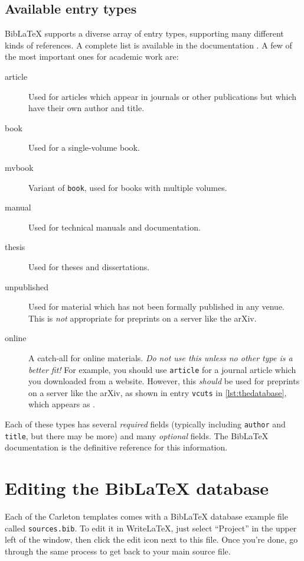 \documentclass{article}
\newcommand*{\code}[1]{\texttt{#1}}
\begin{document}
\subsection{Available entry types}
\label{s:entrytypes}
Bib\LaTeX{} supports a diverse array of entry types, supporting many different kinds of references.
A complete list is available in the documentation \cite{biblatex}.
A few of the most important ones for academic work are:
\begin{description}
\item[article]
  Used for articles which appear in journals or other publications but which have their own author and title.

\item[book]
  Used for a single-volume book.

\item[mvbook]
  Variant of \code{book}, used for books with multiple volumes.

\item[manual]
  Used for technical manuals and documentation.

\item[thesis]
  Used for theses and dissertations.

\item[unpublished]
  Used for material which has not been formally published in any venue.
  This is \emph{not} appropriate for preprints on a server like the arXiv.

\item[online]
  A catch-all for online materials.
  \emph{Do not use this unless no other type is a better fit!}
  For example, you should use \code{article} for a journal article which you downloaded from a website.
  However, this \emph{should} be used for preprints on a server like the arXiv, as shown in entry \code{vcuts} in \cref{lst:thedatabase}, which appears as \cite{vcuts}.
\end{description}

Each of these types has several \emph{required} fields (typically including \code{author} and \code{title}, but there may be more) and many \emph{optional} fields.
The Bib\LaTeX{} documentation is the definitive reference for this information.

\section{Editing the Bib\LaTeX{} database}
\label{s:editing}
Each of the Carleton templates comes with a Bib\LaTeX{} database example file called \code{sources.bib}.
To edit it in Write\LaTeX{}, just select \enquote{Project} in the upper left of the window, then click the edit icon next to this file.
Once you're done, go through the same process to get back to your main source file.
\end{document}
